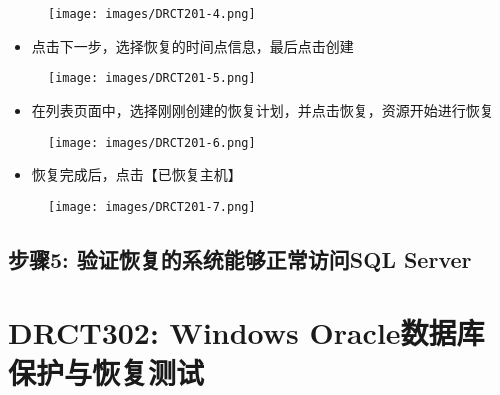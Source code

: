 \begin{figure}[htbp]
\centering
\texttt{[image: images/DRCT201-4.png]}
\end{figure}

\begin{itemize}
\item 点击下一步，选择恢复的时间点信息，最后点击创建

\end{itemize}

\begin{figure}[htbp]
\centering
\texttt{[image: images/DRCT201-5.png]}
\end{figure}

\begin{itemize}
\item 在列表页面中，选择刚刚创建的恢复计划，并点击恢复，资源开始进行恢复

\end{itemize}

\begin{figure}[htbp]
\centering
\texttt{[image: images/DRCT201-6.png]}
\end{figure}

\begin{itemize}
\item 恢复完成后，点击【已恢复主机】

\end{itemize}

\begin{figure}[htbp]
\centering
\texttt{[image: images/DRCT201-7.png]}
\end{figure}

\subsection{步骤5: 验证恢复的系统能够正常访问SQL Server}
\label{步骤5:验证恢复的系统能够正常访问sqlserver}

\section{DRCT302: Windows Oracle数据库保护与恢复测试}
\label{drct302:windowsoracle数据库保护与恢复测试}

